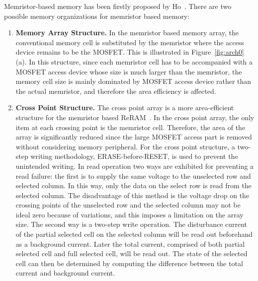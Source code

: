 Memristor-based memory has been firstly proposed by Ho~\cite{memristor:pengli}. There are two possible memory organizations
for memristor based memory: \begin{enumerate}
\item \noindent\textbf{Memory Array Structure.} In the memristor based
    memory array, the conventional memory cell is substituted by the
    memristor where the access device remains to be the MOSFET. This is illustrated in Figure~\ref{fig:arch0}(a). In this structure, since each memristor cell has to be accompanied with a MOSFET access device whose size is much larger than the memristor, the memory cell size is mainly dominated by MOSFET access device rather than the actual memristor, and therefore the area efficiency is affected.

  \item \noindent\textbf{Cross Point Structure.}
  The cross point array is a more area-efficient structure for the memristor based ReRAM~\cite{memristor:Cong}. In the cross point array, the only item at each crossing point is the memristor cell. Therefore, the area of the array is significantly reduced since the large MOSFET access part is removed without considering memory peripheral. For the cross point structure, a two-step writing methodology, ERASE-before-RESET, is used to prevent the unintended writing. In read operation two ways are exhibited for preventing a read failure: the first is to supply the same voltage to the unselected row and selected column. In this way, only the data on the select row is read from the selected column. The disadvantage of this method is the voltage drop on the crossing points of the unselected row and the selected column may not be ideal zero because of variations, and this imposes a limitation on the array size. The second way is a two-step write operation. The disturbance current of the partial selected cell on the selected column will be read out beforehand as a background current. Later the total current, comprised of both partial selected cell and full selected cell, will be read out. The state of the selected cell can then be determined by computing the difference between the total current and background current.

   \end{enumerate}

